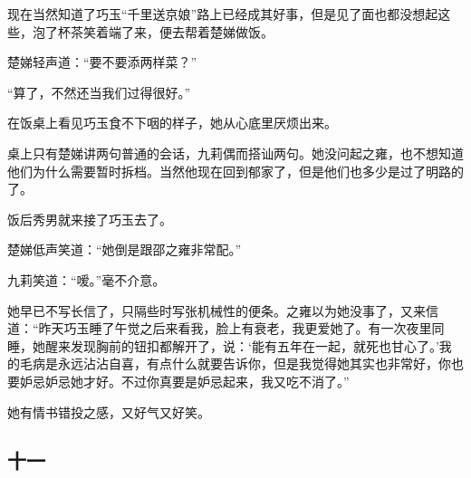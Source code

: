 \par 现在当然知道了巧玉“千里送京娘”路上已经成其好事，但是见了面也都没想起这些，泡了杯茶笑着端了来，便去帮着楚娣做饭。
\par 楚娣轻声道：“要不要添两样菜？”
\par “算了，不然还当我们过得很好。”
\par 在饭桌上看见巧玉食不下咽的样子，她从心底里厌烦出来。
\par 桌上只有楚娣讲两句普通的会话，九莉偶而搭讪两句。她没问起之雍，也不想知道他们为什么需要暂时拆档。当然他现在回到郁家了，但是他们也多少是过了明路的了。
\par 饭后秀男就来接了巧玉去了。
\par 楚娣低声笑道：“她倒是跟邵之雍非常配。”
\par 九莉笑道：“嗳。”毫不介意。
\par 她早已不写长信了，只隔些时写张机械性的便条。之雍以为她没事了，又来信道：“昨天巧玉睡了午觉之后来看我，脸上有衰老，我更爱她了。有一次夜里同睡，她醒来发现胸前的钮扣都解开了，说：‘能有五年在一起，就死也甘心了。’我的毛病是永远沾沾自喜，有点什么就要告诉你，但是我觉得她其实也非常好，你也要妒忌妒忌她才好。不过你真要是妒忌起来，我又吃不消了。”
\par 她有情书错投之感，又好气又好笑。

\subsection{十一}

